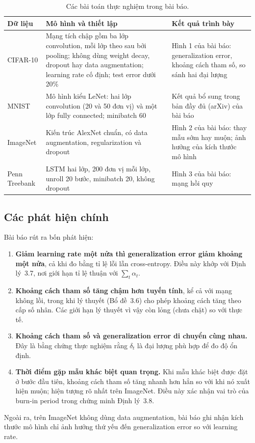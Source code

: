 \begin{table}[H]
\centering
\caption{Các bài toán thực nghiệm trong bài báo.}
\label{tab:thucnghiem-baibao}
\begin{tabular}{|p{2.6cm}|p{6.4cm}|p{4.2cm}|}
\hline
\textbf{Dữ liệu} & \textbf{Mô hình và thiết lập} & \textbf{Kết quả trình bày} \\ \hline
CIFAR-10 & Mạng tích chập gồm ba lớp convolution, mỗi lớp theo sau bởi pooling; không dùng weight decay, dropout hay data augmentation; learning rate cố định; test error dưới 20\% & Hình 1 của bài báo: generalization error, khoảng cách tham số, so sánh hai đại lượng \\ \hline
MNIST & Mô hình kiểu LeNet: hai lớp convolution (20 và 50 đơn vị) và một lớp fully connected; minibatch 60 & Kết quả bổ sung trong bản đầy đủ (arXiv) của bài báo \\ \hline
ImageNet & Kiến trúc AlexNet chuẩn, có data augmentation, regularization và dropout & Hình 2 của bài báo: thay mẫu sớm hay muộn; ảnh hưởng của kích thước mô hình \\ \hline
Penn Treebank & LSTM hai lớp, 200 đơn vị mỗi lớp, unroll 20 bước, minibatch 20, không dropout & Hình 3 của bài báo: mạng hồi quy \\ \hline
\end{tabular}
\end{table}

\subsection{Các phát hiện chính}

Bài báo rút ra bốn phát hiện:
\begin{enumerate}
    \item \textbf{Giảm learning rate một nửa thì generalization error giảm khoảng một nửa}, cả khi đo bằng tỉ lệ lỗi lẫn cross-entropy. Điều này khớp với Định lý~3.7, nơi giới hạn tỉ lệ thuận với $\sum_t \alpha_t$.
    \item \textbf{Khoảng cách tham số tăng chậm hơn tuyến tính}, kể cả với mạng không lồi, trong khi lý thuyết (Bổ đề~3.6) cho phép khoảng cách tăng theo cấp số nhân. Các giới hạn lý thuyết vì vậy còn lỏng (chưa chặt) so với thực tế.
    \item \textbf{Khoảng cách tham số và generalization error di chuyển cùng nhau.} Đây là bằng chứng thực nghiệm rằng $\delta_t$ là đại lượng phù hợp để đo độ ổn định.
    \item \textbf{Thời điểm gặp mẫu khác biệt quan trọng.} Khi mẫu khác biệt được đặt ở bước đầu tiên, khoảng cách tham số tăng nhanh hơn hẳn so với khi nó xuất hiện muộn; hiện tượng rõ nhất trên ImageNet. Điều này xác nhận vai trò của burn-in period trong chứng minh Định lý~3.8.
\end{enumerate}
Ngoài ra, trên ImageNet không dùng data augmentation, bài báo ghi nhận kích thước mô hình chỉ ảnh hưởng thứ yếu đến generalization error so với learning rate.

